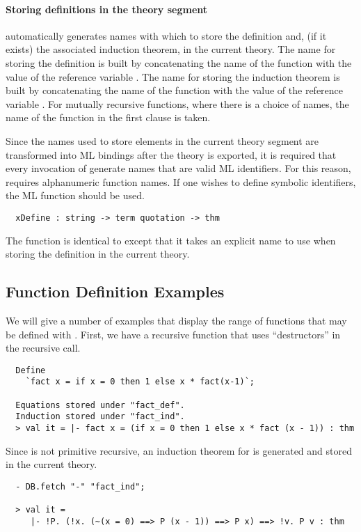 \paragraph{Storing definitions in the theory segment}

  automatically generates names with which to store the
definition and, (if it exists) the associated induction theorem, in
the current theory. The name for storing the definition is built by
concatenating the name of the function with the value of the reference
variable . The name for storing the induction theorem
is built by concatenating the name of the function with the value of
the reference variable . For mutually recursive
functions, where there is a choice of names, the name of the function
in the first clause is taken.

 Since the names used to store elements in the current theory segment
are transformed into ML bindings after the theory is exported, it is
required that every invocation of  generate names that are
valid ML identifiers. For this reason,  requires
alphanumeric function names. If one wishes to define symbolic
identifiers, the ML function  should be used.

\begin{hol}
\begin{verbatim}
  xDefine : string -> term quotation -> thm
\end{verbatim}
\end{hol}
The  function is identical to
 except that it takes an explicit name to use when
storing the definition in the current theory.

\subsection{Function Definition Examples}
 We will give a number of examples that display the range of functions
that may be defined with . First, we have a recursive function
that uses ``destructors'' in the recursive call.

\begin{hol}
\begin{verbatim}
  Define
    `fact x = if x = 0 then 1 else x * fact(x-1)`;

  Equations stored under "fact_def".
  Induction stored under "fact_ind".
  > val it = |- fact x = (if x = 0 then 1 else x * fact (x - 1)) : thm
\end{verbatim}
\end{hol}
%
Since  is not
primitive recursive, an induction theorem for  is generated and
stored in the current theory.
%
\begin{hol}
\begin{verbatim}
  - DB.fetch "-" "fact_ind";

  > val it =
     |- !P. (!x. (~(x = 0) ==> P (x - 1)) ==> P x) ==> !v. P v : thm
\end{verbatim}
\end{hol}

